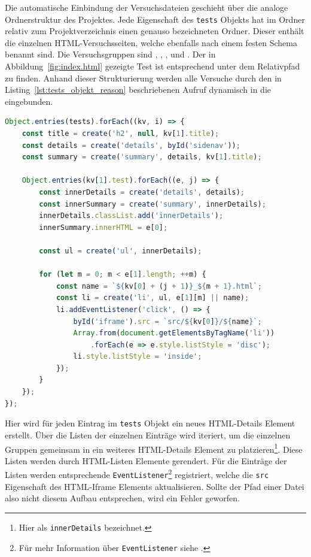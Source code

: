 Die automatische Einbindung der Versuchsdateien geschieht über die analoge Ordnerstruktur des Projektes.
Jede Eigenschaft des \lstinline{tests} Objekts hat im  Ordner relativ zum Projektverzeichnis einen genauso bezeichneten Ordner.
Dieser enthält die einzelnen HTML-Versuchsseiten, welche ebenfalls nach einem festen Schema benannt sind.
Die Versuchsgruppen sind , , ,  und .
Der in Abbildung~\ref{fig:index.html} gezeigte Test ist entsprechend unter dem Relativpfad  zu finden.
Anhand dieser Strukturierung werden alle Versuche durch den in Listing~\ref{lst:tests_objekt_reason} beschriebenen Aufruf dynamisch in die  eingebunden.

\begin{lstlisting}[language=JavaScript, caption={Iteration über das tests Objekt zur Befüllung der Navigationsleiste.}, label={lst:tests_objekt_reason}]
Object.entries(tests).forEach((kv, i) => {
    const title = create('h2', null, kv[1].title);
    const details = create('details', byId('sidenav'));
    const summary = create('summary', details, kv[1].title);

    Object.entries(kv[1].test).forEach((e, j) => {
        const innerDetails = create('details', details);
        const innerSummary = create('summary', innerDetails);
        innerDetails.classList.add('innerDetails');
        innerSummary.innerHTML = e[0];

        const ul = create('ul', innerDetails);

        for (let m = 0; m < e[1].length; ++m) {
            const name = `${kv[0] + (j + 1)}_${m + 1}.html`;
            const li = create('li', ul, e[1][m] || name);
            li.addEventListener('click', () => {
                byId('iframe').src = `src/${kv[0]}/${name}`;
                Array.from(document.getElementsByTagName('li'))
                    .forEach(e => e.style.listStyle = 'disc');
                li.style.listStyle = 'inside';
            });
        }
    });
});
\end{lstlisting}

Hier wird für jeden Eintrag im \lstinline{tests} Objekt ein neues HTML-Details Element erstellt.
Über die Listen der einzelnen Einträge wird iteriert, um die einzelnen Gruppen gemeinsam in ein weiteres HTML-Details Element zu platzieren\footnote{Hier als \lstinline{innerDetails} bezeichnet.}.
Diese Listen werden durch HTML-Listen Elemente gerendert.
Für die Einträge der Listen werden entsprechende \lstinline{EventListener}\footnote{Für mehr Information über \lstinline{EventListener} siehe .} registriert, welche die \lstinline{src} Eigenschaft des HTML-Iframe Elements aktualisieren.
Sollte der Pfad einer Datei also nicht diesem Aufbau entsprechen, wird ein Fehler geworfen.

